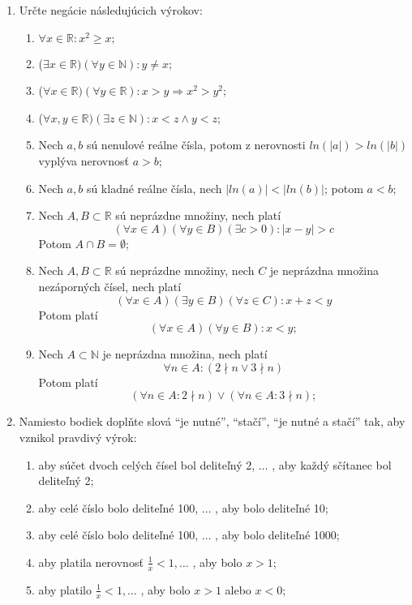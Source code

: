 \begin{enumerate}
  \item Určte negácie následujúcich výrokov:
  \begin{enumerate}[label=\arabic*.]
    \item $\forall x \in \mathbb{R} : x^2 \geq x;$
    \item ($\exists x \in \mathbb{R})(\forall y \in \mathbb{N}): y \neq x;$
    \item ($\forall x \in \mathbb{R})(\forall y \in \mathbb{R}):
          x > y \Rightarrow x^2 > y^2;$
    \item ($\forall x, y \in \mathbb{R})(\exists z \in \mathbb{N}):
          x < z \land y < z;$
    \item Nech $a, b$ sú nenulové reálne čísla, potom z nerovnosti
          $ln(|a|) > ln(|b|)$ vyplýva nerovnosť $a > b$;
    \item Nech $a, b$ sú kladné reálne čísla, nech $|ln(a)| < |ln(b)|$;
          potom $a < b$;
    \item Nech $A, B \subset \mathbb{R}$ sú neprázdne množiny, nech platí
          $$(\forall x \in A)(\forall y \in B)(\exists c > 0): |x - y| > c$$
          Potom $A \cap B = \emptyset$;
    \item Nech $A, B \subset \mathbb{R}$ sú neprázdne množiny, nech $C$ je
          neprázdna množina nezáporných čísel, nech platí
          $$(\forall x \in A)(\exists y \in B)(\forall z \in C): x + z < y$$
          Potom platí
          $$(\forall x \in A)(\forall y \in B): x < y;$$
    \item Nech $A \subset \mathbb{N}$ je neprázdna množina, nech platí
          $$\forall n \in A: (2 \nmid n \lor 3 \nmid n)$$
          Potom platí
          $$(\forall n \in A: 2 \nmid n) \lor (\forall n \in A: 3 \nmid n);$$
  \end{enumerate}
  \item Namiesto bodiek doplňte slová \enquote{je nutné}, \enquote{stačí},
        \enquote{je nutné a stačí} tak, aby vznikol pravdivý výrok:
  \begin{enumerate}[label=\arabic*.]
    \item aby súčet dvoch celých čísel bol deliteľný 2, $\ldots$ , aby každý
          sčítanec bol deliteľný 2;
    \item aby celé číslo bolo deliteľné 100, $\ldots$ , aby bolo deliteľné 10;
    \item aby celé číslo bolo deliteľné 100, $\ldots$ , aby bolo deliteľné
          1000;
    \item aby platila nerovnosť $\frac{1}{x} < 1, \ldots$ , aby bolo $x > 1$;
    \item aby platilo $\frac{1}{x} < 1, \ldots$ , aby bolo $x > 1$ alebo
          $x < 0$;
  \end{enumerate}
\end{enumerate}

